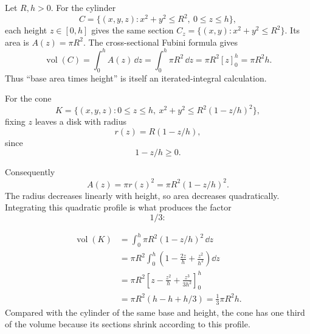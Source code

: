 \begin{example}\label{ex:cylinder-cone-slices}
Let $R,h>0$. For the cylinder
\[
C=\{(x,y,z):x^2+y^2\leq R^2,\ 0\leq z\leq h\},
\]
each height $z\in[0,h]$ gives the same section
$C_z=\{(x,y):x^2+y^2\leq R^2\}$. Its area is $A(z)=\pi R^2$.
The cross-sectional Fubini formula gives
\[
\operatorname{vol}(C)=\int_0^h A(z)\,\dd z
=\int_0^h\pi R^2\,\dd z=\pi R^2[z]_0^h=\pi R^2h.
\]
Thus ``base area times height'' is itself an iterated-integral calculation.

For the cone
\[
K=\{(x,y,z):0\leq z\leq h,\ x^2+y^2\leq R^2(1-z/h)^2\},
\]
fixing $z$ leaves a disk with radius
\[
r(z)=R(1-z/h),
\]
 since
\[
1-z/h\geq0.
\]

Consequently
\[
A(z)=\pi r(z)^2=\pi R^2(1-z/h)^2.
\]
The radius decreases linearly with height, so area decreases quadratically.
Integrating this quadratic profile is what produces the factor
\[
1/3:
\]

\begin{align*}
\operatorname{vol}(K)
&=\int_0^h\pi R^2(1-z/h)^2\,\dd z\\
&=\pi R^2\int_0^h\left(1-\frac{2z}{h}+\frac{z^2}{h^2}\right)\dd z\\
&=\pi R^2\left[z-\frac{z^2}{h}+\frac{z^3}{3h^2}\right]_0^h\\
&=\pi R^2(h-h+h/3)=\frac13\pi R^2h.
\end{align*}
Compared with the cylinder of the same base and height, the cone has one
third of the volume because its sections shrink according to this profile.
\begin{center}
\end{center}
\end{example}
